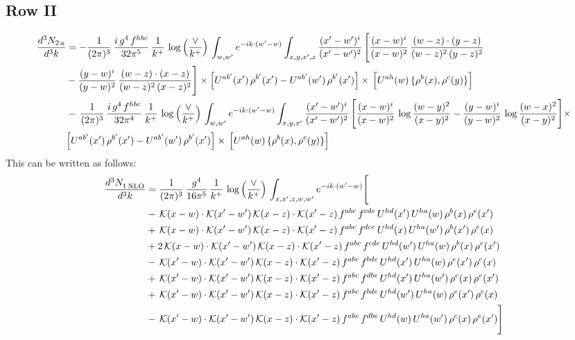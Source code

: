 \documentclass[9pt]{article}
\numberwithin{equation}{section}
\begin{document}
\subsection{Row II}
\begin{align}
\frac{d^{3}N_{2\,a}}{d^{3}k} & =  -\frac{1}{(2\pi)^{3}}\,\frac{i\,g^{4}\,f^{hbc}}{32\pi^{5}}\,\frac{1}{k^{+}}\,\log{\left(\frac{\vee}{k^{+}}\right)}\,
\int_{w,w'} e^{-ik\cdot(w'-w)}\int_{x,y,x',z}\frac{(x'-w')^{i}}{(x'-w')^{2}}\,\Bigg[\frac{(x-w)^{i}}{(x-w)^{2}}\, \frac{(w-z)\cdot (y-z)}{(w-z)^{2}\,(y-z)^{2}}\notag \\ & - \frac{(y-w)^{i}}{(y-w)^{2}}\, \frac{(w-z)\cdot (x-z)}{(w-z)^{2}\,(x-z)^{2}}\Bigg]\times\Big[U^{ab'}(x')\,\rho^{b'}(x')-U^{ab'}(w')\,\rho^{b'}(x')\Big]\times\, \Big[U^{ah}(w)\,\{\rho^{b}(x),\rho^{c}(y)\}\Big] \notag \\
& -\,\frac{1}{(2\pi)^{3}}\,\frac{i\,g^{4}\,f^{hbc}}{32\pi^{4}}\,\frac{1}{k^{+}}\,\log{\left(\frac{\vee}{k^{+}}\right)}\,
\int_{w,w'} e^{-ik\cdot(w'-w)}\int_{x,y,x'}\frac{(x'-w')^{i}}{(x'-w')^{2}}\,\Bigg[\frac{(x-w)^{i}}{(x-w)^{2}}\,\log\frac{(w-y)^{2}}{(x-y)^{2}}-\frac{(y-w)^{i}}{(y-w)^{2}}\,\log\frac{(w-x)^{2}}{(x-y)^{2}}\Bigg]\times\notag \\ & \Big[U^{ab'}(x')\,\rho^{b'}(x')-U^{ab'}(w')\,\rho^{b'}(x')\Big]\times\, \Big[U^{ah}(w)\,\{\rho^{b}(x),\rho^{c}(y)\}\Big]
\end{align}
This can be written as follows: 
\begin{align}
\frac{d^{3}N_{1\,\rm NLO}^{\rm}}{d^{3}k}  & = \frac{1}{(2\pi)^{3}}\,\frac{g^{4}}{16\pi^{5}}\,\frac{1}{k^{+}}\,\log{\left(\frac{\vee}{k^{+}}\right)}\, \int_{x,x',z,w,w'}e^{-ik\cdot(w'-w)}\Bigg[\notag\\
&-\,\mathcal{K}(x-w)\cdot\mathcal{K}(x'-w')\,\mathcal{K}(x-z)\cdot\mathcal{K}(x'-z)\,f^{abc}\,f^{cde}\,U^{hd}(x')\,U^{ha}(w)\,\rho^{b}(x)\,\rho^{e}(x')\notag\\
&+\,\mathcal{K}(x-w)\cdot\mathcal{K}(x'-w')\,\mathcal{K}(x-z)\cdot\mathcal{K}(x'-z)\,f^{abc}\,f^{dce}\,U^{hd}(x)\,U^{ha}(w')\,\rho^{b}(x')\,\rho^{e}(x)\notag\\
&+2\,\mathcal{K}(x-w)\cdot\mathcal{K}(x'-w')\,\mathcal{K}(x-z)\cdot\mathcal{K}(x'-z)\,f^{abc}\,f^{cde}\,U^{hd}(w')\,U^{ha}(w)\,\rho^{b}(x)\,\rho^{e}(x')\notag\\
&-\,\mathcal{K}(x'-w)\cdot\mathcal{K}(x'-w')\,\mathcal{K}(x-z)\cdot\mathcal{K}(x'-z)\,f^{abc}\,f^{bde}\,U^{hd}(x')\,U^{ha}(w)\,\rho^{e}(x')\,\rho^{c}(x)\notag\\
&+\,\mathcal{K}(x'-w)\cdot\mathcal{K}(x'-w')\,\mathcal{K}(x-z)\cdot\mathcal{K}(x'-z)\,f^{abc}\,f^{dbe}\,U^{hd}(x')\,U^{ha}(w')\,\rho^{c}(x)\,\rho^{e}(x')\notag\\
&+\,\mathcal{K}(x'-w)\cdot\mathcal{K}(x'-w')\,\mathcal{K}(x-z)\cdot\mathcal{K}(x'-z)\,f^{abc}\,f^{bde}\,U^{hd}(w')\,U^{ha}(w)\,\rho^{e}(x')\,\rho^{c}(x)\notag\\
&-\,\mathcal{K}(x'-w)\cdot\mathcal{K}(x'-w')\,\mathcal{K}(x-z)\cdot\mathcal{K}(x'-z)\,f^{abc}\,f^{dbe}\,U^{hd}(w)\,U^{ha}(w')\,\rho^{c}(x)\,\rho^{e}(x')\Bigg]
\end{align}
\end{document}
